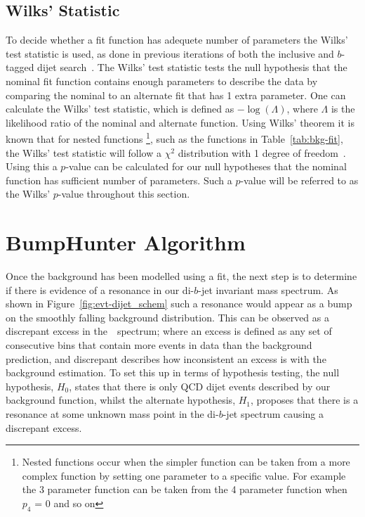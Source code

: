 \subsection{Wilks' Statistic}
\label{sec:bkg-bkg_wilks}

To decide whether a fit function has adequete number of parameters the Wilks' test statistic is used,
as done in previous iterations of both the inclusive and $b$-tagged dijet search~\cite{dijet-mori16_paper,dibjet-mori16_paper}.
The Wilks' test statistic tests the null hypothesis that the nominal fit function contains enough parameters to describe the data
by comparing the nominal to an alternate fit that has 1 extra parameter.
One can calculate the Wilks' test statistic, which is defined as $-\log{(\Lambda)}$, where $\Lambda$ is the likelihood ratio of the nominal and alternate function.
Using Wilks' theorem it is known that for nested functions
\footnote{Nested functions occur when the simpler function can be taken from a more complex function by setting one parameter to a specific value.
  For example the 3 parameter function can be taken from the 4 parameter function when $p_4$ = 0 and so on},
such as the functions in Table~\ref{tab:bkg-fit},
the Wilks' test statistic will follow a $\chi^2$ distribution with 1 degree of freedom~\cite{dibjet-wilks}.
Using this a $p$-value can be calculated for our null hypotheses that the nominal function has sufficient number of parameters.
Such a $p$-value will be referred to as the Wilks' $p$-value throughout this section.


\section{BumpHunter Algorithm}
\label{sec:bkg-bh}

Once the background has been modelled using a fit, the next step is to determine
if there is evidence of a resonance in our di-$b$-jet invariant mass spectrum.
As shown in Figure~\ref{fig:evt-dijet_schem} such a resonance would appear as a bump on the smoothly falling background distribution.
This can be observed as a discrepant excess in the~\mjj~spectrum;
where an excess is defined as any set of consecutive bins that contain
more events in data than the background prediction,
and discrepant describes how inconsistent an excess is with the background estimation.
To set this up in terms of hypothesis testing, the null hypothesis, $H_0$,
states that there is only QCD dijet events described by our background function,
whilst the alternate hypothesis, $H_1$, proposes that there is a resonance at some
unknown mass point in the di-$b$-jet spectrum causing a discrepant excess.

